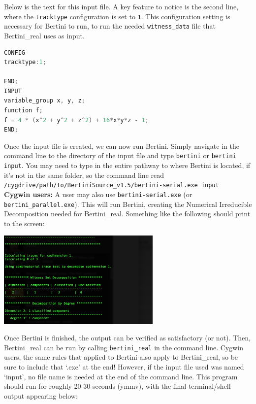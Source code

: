 Below is the text for this input file.  A key feature to notice is the second line, where the \texttt{tracktype} configuration is set to {\tt 1}. This configuration setting is necessary for Bertini to run, to run the needed {\tt witness\_data} file that Bertini\_real uses as input. 

\begin{center}\begin{minipage}{0.9\linewidth}
\begin{lstlisting}[language=c++, caption={\tt input} for the Cayley Cubic, captionpos=b]
CONFIG 
tracktype:1;

END;
INPUT
variable_group x, y, z;
function f;
f = 4 * (x^2 + y^2 + z^2) + 16*x*y*z - 1;
END;
\end{lstlisting}
\end{minipage}\end{center}

Once the input file is created, we can now run Bertini. Simply navigate in the command line to the directory of the input file and type \texttt{bertini} or \texttt{bertini input}.  You may need to type in the entire pathway to where Bertini is located, if it's not in the same folder, so the command line read \newline \texttt{/cygdrive/path/to/BertiniSource\_v1.5/bertini-serial.exe input}\- \\ \textbf{Cygwin users:} A user may also use \texttt{bertini-serial.exe} (or \texttt{bertini\_parallel.exe}). This will run Bertini, creating the Numerical Irreducible Decomposition needed for Bertini\_real. Something like the following should print to the screen:

\begin{center}\begin{minipage}{0.9\linewidth}
\centering
\includegraphics[width=0.6\textwidth]{CayleyCubicBertiniRun.png}
\end{minipage}\end{center}

Once Bertini is finished, the output can be verified as satisfactory (or not). Then, Bertini\_real can be run by calling \texttt{bertini\_real} in the command line. Cygwin users, the same rules that applied to Bertini also apply to Bertini\_real, so be sure to include that `.exe' at the end! However, if the input file used was named `input', no file name is needed at the end of the command line. This program should run for roughly 20-30 seconds (ymmv), with the final terminal/shell output appearing below:

